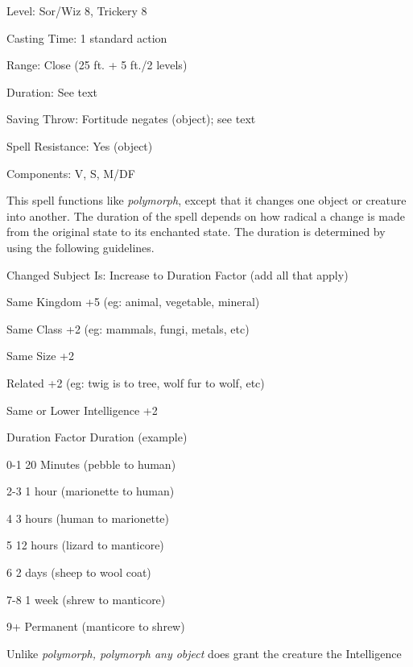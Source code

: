 
\begin{description*}
\item[Level:] Sor/Wiz 8, Trickery 8
\item[Casting Time:] 1 standard action
\item[Range:] Close (25 ft. + 5 ft./2 levels)
\item[Duration:] See text
\item[Saving Throw:] Fortitude negates (object); see text
\item[Spell Resistance:] Yes (object)
\item[Components:] V, S, M/DF
\end{description*}

This spell functions like \textit{polymorph}, except that it changes one object
or creature into another. The duration of the spell depends on how radical a change
is made from the original state to its enchanted state. The duration is determined
by using the following guidelines.
\begin{description*}
\item[Changed Subject Is:] Increase to Duration Factor (add all that apply)
\item[Same Kingdom] +5 (eg: animal, vegetable, mineral)
\item[Same Class] +2 (eg: mammals, fungi, metals, etc)
\item[Same Size] +2
\item[Related] +2 (eg: twig is to tree, wolf fur to wolf, etc)
\item[Same or Lower Intelligence] +2
\end{description*}
\begin{description*}
\item[Duration Factor] Duration (example)
\item[0-1] 20 Minutes (pebble to human)
\item[2-3] 1 hour (marionette to human)
\item[4] 3 hours (human to marionette)
\item[5] 12 hours (lizard to manticore)
\item[6] 2 days (sheep to wool coat)
\item[7-8] 1 week (shrew to manticore)
\item[9+] Permanent (manticore to shrew)
\end{description*}
Unlike \textit{polymorph, polymorph any object} does grant the creature the Intelligence
